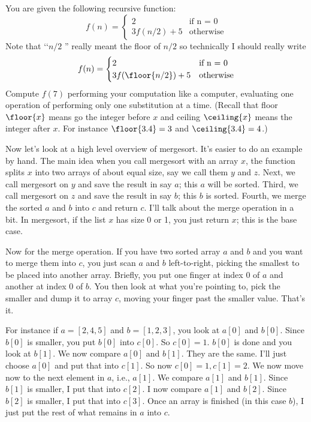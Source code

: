 \newpage
\begin{ex}
You are given the following recursive function:
\[
f(n) = 
\begin{cases}
2           & \text{if n = 0} \\
3f(n/2) + 5 &\text{otherwise} 
\end{cases}
\]
Note that \lq\lq $n/2$ '' really 
meant the floor of $n/2$ so technically I should 
really write
\[
f(n) = 
\begin{cases}
  2                 & \text{if n = 0} \\
3f(\floor{n/2}) + 5 & \text{otherwise}
\end{cases}
\]
Compute $f(7)$ performing your computation like a computer,
evaluating one operation of performing only one substitution at a time.
(Recall that floor $\floor{x}$ means go the integer before $x$
and ceiling $\ceiling{x}$ means the integer after $x$.
For instance $\floor{3.4} = 3$ and $\ceiling{3.4} = 4$.)
\end{ex}



Now let's look at a high level overview of mergesort.
It's easier to do an example by hand.
The main idea when you call mergesort with an array $x$,
the function splits $x$ into two arrays of about equal size,
say we call them $y$ and $z$.
Next, we call mergesort on $y$ and save the result in say $a$;
this $a$ will be sorted.
Third, we call mergesort on $z$ and save the result in say $b$;
this $b$ is sorted.
Fourth, we merge the sorted $a$ and $b$ into $c$ and return $c$.
I'll talk about the merge operation in a bit.
In mergesort, if the list $x$ has size 0 or 1, you just return $x$;
this is the base case.

Now for the merge operation.
If you have two sorted array $a$ and $b$ and you want to 
merge them into $c$,
you just scan $a$ and $b$ left-to-right,
picking the smallest to be placed into another array.
Briefly, you put one finger at index $0$ of $a$ and 
another at index $0$ of $b$.
You then look at what you're pointing to,
pick the smaller and dump it to array $c$,
moving your finger past the smaller value.
That's it.

For instance if $a = [2,4,5]$ and $b=[1,2,3]$,
you look at $a[0]$ and $b[0]$.
Since $b[0]$ is smaller, you put $b[0]$ into $c[0]$.
So $c[0] = 1$. $b[0]$ is done and you look at $b[1]$.
We now compare $a[0]$ and $b[1]$. They are the same.
I'll just choose $a[0]$ and put that into $c[1]$.
So now $c[0]=1, c[1]=2$. We now move now to the next element in $a$,
i.e., $a[1]$. We compare $a[1]$ and $b[1]$.
Since $b[1]$ is smaller, I put that into $c[2]$.
I now compare $a[1]$ and $b[2]$.
Since $b[2]$ is smaller, I put that into $c[3]$.
Once an array is finished (in this case $b$), I just put the rest
of what remains in $a$ into $c$.


